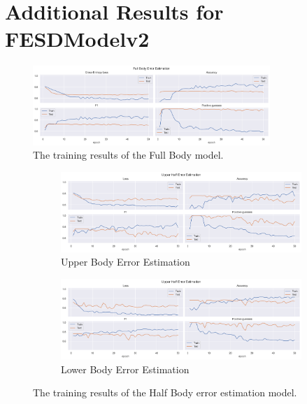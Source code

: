 
\chapter{Additional Results for FESDModelv2}

\begin{figure}[htbp]
  \centering
  \includegraphics[width=0.8\textwidth]{figures/Results/v2/fb/FullBody_ErrorEstimation.png}
  \caption[Full Body model training results]{The training results of the Full Body model.}
  \label{fig:full_body_training_results_v2}
\end{figure}

\begin{figure}[htbp]
  \centering
  \begin{subfigure}[b]{0.8\textwidth}
      \centering
      \includegraphics[width=\textwidth]{figures/Results/v2/hb/UpperBody_ErrorEstimation.png}
      \caption{Upper Body Error Estimation}
      \label{fig:uh_ee}
  \end{subfigure}
  \hfill
  \begin{subfigure}[b]{0.8\textwidth}
      \centering
      \includegraphics[width=\textwidth]{figures/Results/v2/hb/LowerBody_ErrorEstimation_uh.png}
      \caption{Lower Body Error Estimation}
      \label{fig:lh_ee}
  \end{subfigure}
  \caption[Half Body model training results]{The training results of the Half Body error estimation model.}
     \label{fig:half_body_training_results}
\end{figure}

